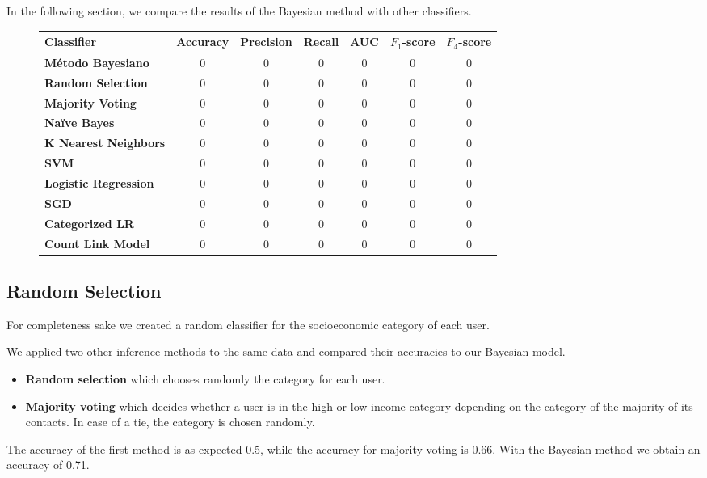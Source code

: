 In the following section, we compare the results of the Bayesian method with other classifiers.

\begin{figure}
	\begin{tabularx}{\textwidth}{>{\bfseries}X c c c c c c}
		\toprule
		\textbf{Classifier} & \textbf{Accuracy} & \textbf{Precision} & \textbf{Recall} & \textbf{AUC} & \textbf{$F_1$}-\textbf{score} & \textbf{$F_4$}-\textbf{score} \\
		\midrule
		Método Bayesiano & 0 & 0 & 0 & 0 & 0 & 0 \\
		\midrule
		Random Selection & 0 & 0 & 0 & 0 & 0 & 0 \\
		Majority Voting & 0 & 0 & 0 & 0 & 0 & 0 \\
		\midrule
		Naïve Bayes & 0 & 0 & 0 & 0 & 0 & 0 \\
		K Nearest Neighbors & 0 & 0 & 0 & 0 & 0 & 0 \\
		SVM & 0 & 0 & 0 & 0 & 0 & 0 \\
		Logistic Regression & 0 & 0 & 0 & 0 & 0 & 0 \\
		SGD & 0 & 0 & 0 & 0 & 0 & 0 \\
		\midrule
		Categorized LR & 0 & 0 & 0 & 0 & 0 & 0 \\
		Count Link Model & 0 & 0 & 0 & 0 & 0 & 0 \\
		\bottomrule
	\end{tabularx}
\end{figure}

\subsection{Random Selection}

For completeness sake we created a random classifier for the socioeconomic category of each user.

We applied two other inference methods to the same data and compared their accuracies to our Bayesian model.

\begin{itemize}
	\item \textbf{Random selection} which chooses randomly the category for each user.
	\item \textbf{Majority voting} which decides whether a user is in the high or low income category depending on the category of the majority of its contacts. In case of a tie, the category is chosen randomly.
\end{itemize}

The accuracy of the first method is as expected \num{0.5}, while the accuracy for majority voting is \num{0.66}.
With the Bayesian method we obtain an accuracy of \num{0.71}.
